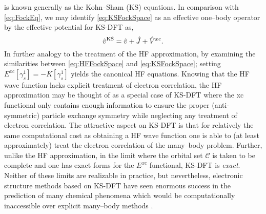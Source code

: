 is known generally as the Kohn--Sham (KS) equations. In comparison with \cref{eq:FockEq}, we may
identify \cref{eq:KSFockSpace} as an effective one--body operator by the effective potential for KS-DFT as,
\begin{equation}
\label{eq:KSPot}
  \hat{v}^{\mathrm{KS}} = \hat{v} + \hat{J} + \hat{V}^{xc}.
\end{equation}
In further analogy
to the treatment of the HF approximation, by examining the similarities between \cref{eq:HFFockSpace} and
\cref{eq:KSFockSpace}; setting $E^{xc}[\gamma_s^1] = -K[\gamma_s^1]$ yields the canonical HF equations.
Knowing that the HF wave function lacks explicit treatment of electron correlation, the HF approximation
may be thought of as a special case of KS-DFT where the xc functional only contains enough information
to ensure the proper (anti-symmetric) particle exchange symmetry while neglecting any treatment of electron
correlation.
The attractive aspect on KS-DFT is that for relatively the same computational cost as obtaining a HF
wave function one is able to (at least approximately) treat the electron correlation of the many--body problem.
Further, unlike the HF approximation, in the limit where the orbital set $\mathcal{C}$ is taken to be complete
and one has exact forms for the $E^{xc}$ functional, KS-DFT is \emph{exact}. Neither of these limits are realizable
in practice, but nevertheless, electronic structure methods based on KS-DFT have seen enormous success in
the prediction of many chemical phenomena which would be computationally inaccessible over explicit many--body methods
.

